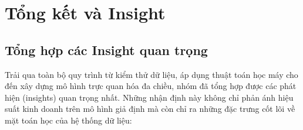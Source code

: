 \section{Tổng kết và Insight}

\subsection{Tổng hợp các Insight quan trọng}
Trải qua toàn bộ quy trình từ kiểm thử dữ liệu, áp dụng thuật toán học máy cho đến xây dựng mô hình trực quan hóa đa chiều, nhóm đã tổng hợp được các phát hiện (insights) quan trọng nhất. Những nhận định này không chỉ phản ánh hiệu suất kinh doanh trên mô hình giả định mà còn chỉ ra những đặc trưng cốt lõi về mặt toán học của hệ thống dữ liệu:

